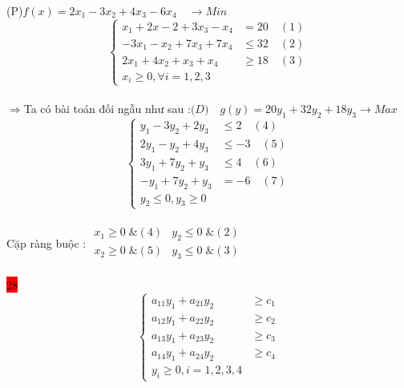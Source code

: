 \documentclass{article}
\begin{document}
\big(P\big)\quad $f(x)=2x_1-3x_2+4x_3-6x_4\quad \longrightarrow Min$\\

\[\left\{\begin{aligned}
    x_1+2x-2+3x_3-x_4&=20 \quad(1)\\
    -3x_1-x_2+7x_3+7x_4&\leq 32 \quad(2)\\
    2x_1+4x_2+x_3+x_4&\geq 18 \quad(3)\\
    x_i\geq 0,\forall i=1,2,3
\end{aligned}\right.\]\\
$\Longrightarrow$Ta có bài toán đối ngẫu như sau :$ \big(D\big)\quad g(y)=20y_1+32y_2+18y_3 \longrightarrow Max$ \\
\[\begin{cases} y_1-3y_2+2y_3&\leq 2 \quad(4)\\
    2y_1-y_2+4y_3&\leq-3 \quad(5)\\
    3y_1+7y_2+y_3&\leq 4 \quad(6)\\
    -y_1+7y_2+y_3&=-6 \quad(7)\\
    y_2\leq 0,y_3\geq 0
\end{cases}\]\\
Cặp ràng buộc : $\begin{array}{cr} 
    x_1\geq 0\; \&(4) &y_2\leq 0\; \&(2)\\
    x_2\geq 0\; \&(5) &y_3\leq 0\; \&(3)\\
\end{array}$


\colorbox{red}{28}\\
\[\begin{cases}a_{11}y_1+a_{21}y_2 &\geq c_1 \\
a_{12}y_1+a_{22}y_2 &\geq c_2 \\
a_{13}y_1+a_{23}y_2 &\geq c_3 \\
a_{14}y_1+a_{24}y_2 &\geq c_4 \\
y_i \geq 0,i=1,2,3,4
\end{cases}\]
\end{document}
